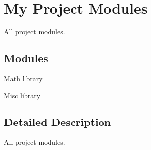 \hypertarget{group__group__main}{}\section{My Project Modules}
\label{group__group__main}


All project modules.  


\subsection*{Modules}
\begin{DoxyCompactItemize}
\item 
\hyperlink{group__group__math}{Math library}
\item 
\hyperlink{group__group__misc}{Misc library}
\end{DoxyCompactItemize}


\subsection{Detailed Description}
All project modules. 

